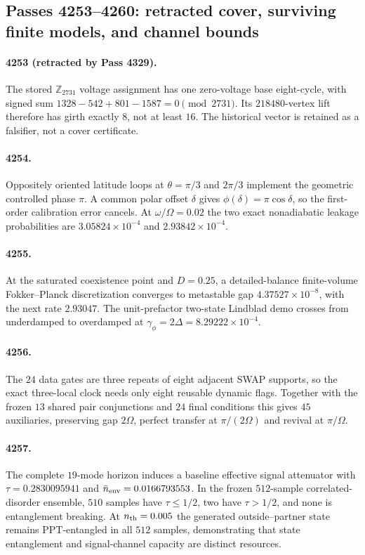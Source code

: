 \subsection*{Passes 4253--4260: retracted cover, surviving finite models, and channel bounds}
\paragraph{4253 (retracted by Pass 4329).} The stored $\mathbb Z_{2731}$ voltage assignment has one zero-voltage base eight-cycle, with signed sum $1328-542+801-1587=0\pmod{2731}$.  Its $218480$-vertex lift therefore has girth exactly $8$, not at least $16$.  The historical vector is retained as a falsifier, not a cover certificate.
\paragraph{4254.} Oppositely oriented latitude loops at $\theta=\pi/3$ and $2\pi/3$ implement the geometric controlled phase $\pi$.  A common polar offset $\delta$ gives $\phi(\delta)=\pi\cos\delta$, so the first-order calibration error cancels.  At $\omega/\Omega=0.02$ the two exact nonadiabatic leakage probabilities are $3.05824\times10^{-4}$ and $2.93842\times10^{-4}$.
\paragraph{4255.} At the saturated coexistence point and $D=0.25$, a detailed-balance finite-volume Fokker--Planck discretization converges to metastable gap $4.37527\times10^{-8}$, with the next rate $2.93047$.  The unit-prefactor two-state Lindblad demo crosses from underdamped to overdamped at $\gamma_\phi=2\Delta=8.29222\times10^{-4}$.
\paragraph{4256.} The $24$ data gates are three repeats of eight adjacent SWAP supports, so the exact three-local clock needs only eight reusable dynamic flags.  Together with the frozen $13$ shared pair conjunctions and $24$ final conditions this gives $45$ auxiliaries, preserving gap $2\Omega$, perfect transfer at $\pi/(2\Omega)$ and revival at $\pi/\Omega$.
\paragraph{4257.} The complete $19$-mode horizon induces a baseline effective signal attenuator with $\tau=0.2830095941$ and $\bar n_{\rm env}=0.0166793553$.  In the frozen $512$-sample correlated-disorder ensemble, $510$ samples have $\tau\le1/2$, two have $\tau>1/2$, and none is entanglement breaking.  At $n_{\rm th}=0.005$ the generated outside--partner state remains PPT-entangled in all $512$ samples, demonstrating that state entanglement and signal-channel capacity are distinct resources.

